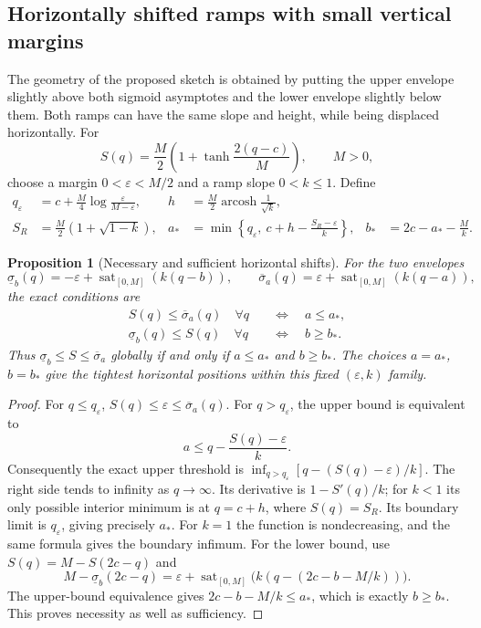 \documentclass[10pt,a4paper]{article}
\newtheorem{proposition}{Proposition}
\theoremstyle{definition}
\theoremstyle{remark}
\newcommand{\sat}{\operatorname{sat}}
\begin{document}
\subsection{Horizontally shifted ramps with small vertical margins}
The geometry of the proposed sketch is obtained by putting the upper envelope slightly above both sigmoid asymptotes and the lower envelope slightly below them. Both ramps can have the same slope and height, while being displaced horizontally. For
\[
 S(q)=\frac M2\left(1+\tanh\frac{2(q-c)}M\right),\qquad M>0,
\]
choose a margin $0<\varepsilon<M/2$ and a ramp slope $0<k\le1$. Define
\begin{align*}
 q_\varepsilon&=c+\frac M4\log\frac{\varepsilon}{M-\varepsilon},
 &h&=\frac M2\operatorname{arcosh}\frac1{\sqrt k},\\
 S_R&=\frac M2(1+\sqrt{1-k}),
 &a_*&=\min\left\{q_\varepsilon,\ c+h-\frac{S_R-\varepsilon}{k}\right\},
 &b_*&=2c-a_*-\frac Mk.
\end{align*}
\begin{proposition}[Necessary and sufficient horizontal shifts]\label{prop:shift-iff}
For the two envelopes
\begin{equation}\label{eq:shifted-envelope}
 \underline\sigma_b(q)=-\varepsilon+\sat_{[0,M]}(k(q-b)),\qquad
 \overline\sigma_a(q)=\varepsilon+\sat_{[0,M]}(k(q-a)),
\end{equation}
the exact conditions are
\begin{align}
 S(q)\le\overline\sigma_a(q)\quad\forall q
 &\quad\Longleftrightarrow\quad a\le a_*,\label{eq:upper-iff}\\
 \underline\sigma_b(q)\le S(q)\quad\forall q
 &\quad\Longleftrightarrow\quad b\ge b_* .\label{eq:lower-iff}
\end{align}
Thus $\underline\sigma_b\le S\le\overline\sigma_a$ globally if and only if $a\le a_*$ and $b\ge b_*$. The choices $a=a_*$, $b=b_*$ give the tightest horizontal positions within this fixed $(\varepsilon,k)$ family.
\end{proposition}

\begin{proof}
For $q\le q_\varepsilon$, $S(q)\le\varepsilon\le\overline\sigma_a(q)$. For $q>q_\varepsilon$, the upper bound is equivalent to
\[
 a\le q-\frac{S(q)-\varepsilon}{k}.
\]
Consequently the exact upper threshold is $\inf_{q>q_\varepsilon}[q-(S(q)-\varepsilon)/k]$. The right side tends to infinity as $q\to\infty$. Its derivative is $1-S'(q)/k$; for $k<1$ its only possible interior minimum is at $q=c+h$, where $S(q)=S_R$. Its boundary limit is $q_\varepsilon$, giving precisely $a_*$. For $k=1$ the function is nondecreasing, and the same formula gives the boundary infimum. For the lower bound, use $S(q)=M-S(2c-q)$ and
\[
 M-\underline\sigma_b(2c-q)
 =\varepsilon+\sat_{[0,M]}\bigl(k(q-(2c-b-M/k))\bigr).
\]
The upper-bound equivalence gives $2c-b-M/k\le a_*$, which is exactly $b\ge b_*$. This proves necessity as well as sufficiency.
\end{proof}
\end{document}
